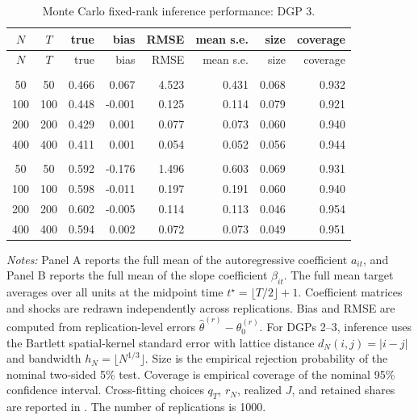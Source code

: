 \begingroup
\small
\setlength{\LTleft}{0pt plus 1fill}
\setlength{\LTright}{0pt plus 1fill}
\begin{longtable}{ccrrrrrr}
\caption{Monte Carlo fixed-rank inference performance: DGP 3.}\label{tab:mc_perf_dgp3}\\
\toprule
$N$ & $T$ & true & bias & RMSE & mean s.e. & size & coverage \\
\midrule
\endfirsthead
\toprule
$N$ & $T$ & true & bias & RMSE & mean s.e. & size & coverage \\
\midrule
\endhead
\bottomrule
\endfoot
\multicolumn{8}{l}{\textit{Panel A. Autoregressive coefficient full mean}}\\
50 & 50 & 0.466 & 0.067 & 4.523 & 0.431 & 0.068 & 0.932 \\
100 & 100 & 0.448 & -0.001 & 0.125 & 0.114 & 0.079 & 0.921 \\
200 & 200 & 0.429 & 0.001 & 0.077 & 0.073 & 0.060 & 0.940 \\
400 & 400 & 0.411 & 0.001 & 0.054 & 0.052 & 0.056 & 0.944 \\
\addlinespace
\multicolumn{8}{l}{\textit{Panel B. Slope coefficient full mean}}\\
50 & 50 & 0.592 & -0.176 & 1.496 & 0.603 & 0.069 & 0.931 \\
100 & 100 & 0.598 & -0.011 & 0.197 & 0.191 & 0.060 & 0.940 \\
200 & 200 & 0.602 & -0.005 & 0.114 & 0.113 & 0.046 & 0.954 \\
400 & 400 & 0.594 & 0.002 & 0.072 & 0.073 & 0.049 & 0.951 \\
\end{longtable}
\par\smallskip
{\footnotesize\begin{minipage}{0.92\textwidth}\textit{Notes:} Panel A reports the full mean of the autoregressive coefficient $a_{it}$, and Panel B reports the full mean of the slope coefficient $\beta_{it}$. The full mean target averages over all units at the midpoint time $t^\star=\lfloor T/2\rfloor+1$. Coefficient matrices and shocks are redrawn independently across replications. Bias and RMSE are computed from replication-level errors $\widehat\theta^{(r)}-\theta_0^{(r)}$. For DGPs 2--3, inference uses the Bartlett spatial-kernel standard error with lattice distance $d_N(i,j)=|i-j|$ and bandwidth $h_N=\lfloor N^{1/3}\rfloor$. Size is the empirical rejection probability of the nominal two-sided 5\% test. Coverage is empirical coverage of the nominal 95\% confidence interval. Cross-fitting choices $q_T$, $r_N$, realized $J$, and retained shares are reported in . The number of replications is 1000.\end{minipage}}
\endgroup
